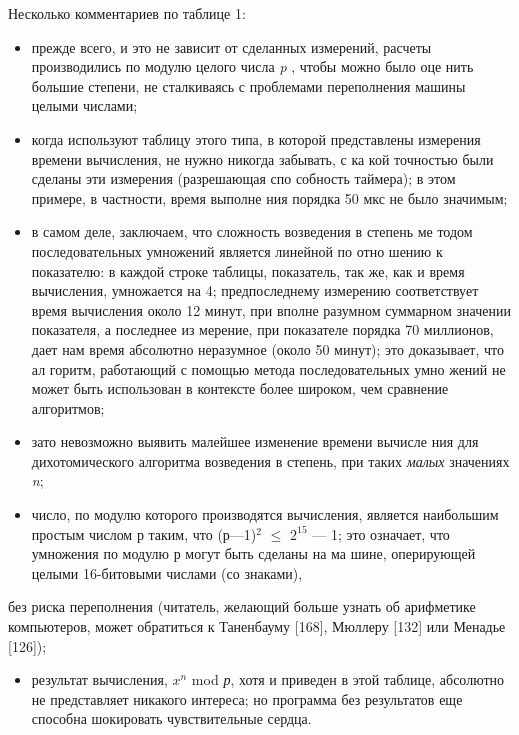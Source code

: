 Несколько комментариев по таблице 1:
\begin{itemize}
\item прежде всего, и это не зависит от сделанных измерений, расчеты
производились по модулю целого числа {\it p} , чтобы можно было оце­
нить большие степени, не сталкиваясь с проблемами переполнения
машины целыми числами;
\item когда используют таблицу этого типа, в которой представлены
измерения времени вычисления, не нужно никогда забывать, с ка­
кой точностью были сделаны эти измерения (разрешающая спо­
собность таймера); в этом примере, в частности, время выполне­
ния порядка 50 мкс не было значимым;
\item в самом деле, заключаем, что сложность возведения в степень ме­
тодом последовательных умножений является линейной по отно­
шению к показателю: в каждой строке таблицы, показатель, так
же, как и время вычисления, умножается на 4; предпоследнему
измерению соответствует время вычисления около 12 минут, при
вполне разумном суммарном значении показателя, а последнее из­
мерение, при показателе порядка 70 миллионов, дает нам время
абсолютно неразумное (около 50 минут); это доказывает, что ал­
горитм, работающий с помощью метода последовательных умно­
жений не может быть использован в контексте более широком,
чем сравнение алгоритмов;
\item  зато невозможно выявить малейшее изменение времени вычисле­
ния для дихотомического алгоритма возведения в степень, при
таких {\it малых} значениях {\it n};
\item число, по модулю которого производятся вычисления, является
наибольшим простым числом р таким, что (р—1)$^2$ $\leqslant$ $2^{15}$ — 1; это
означает, что умножения по модулю р могут быть сделаны на ма­
шине, оперирующей целыми 16-битовыми числами (со знаками),
\end{itemize}
\newpage
\begin{center}
\parbox{12cm}{
без риска переполнения (читатель, желающий больше узнать об
арифметике компьютеров, может обратиться к Таненбауму [168],
Мюллеру [132] или Менадье [126]);}
\end{center}
\begin{itemize}
\item результат вычисления, $x^n$ mod {\it р}, хотя и приведен в этой таблице,
абсолютно не представляет никакого интереса; но программа без
результатов еще способна шокировать чувствительные сердца.
\end{itemize}

